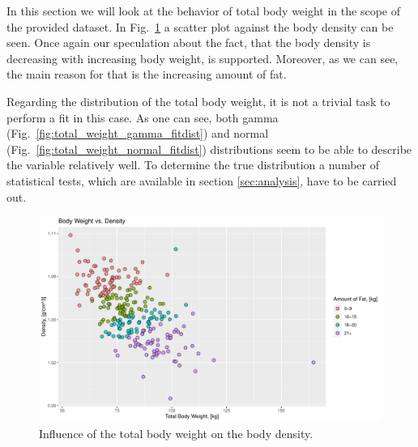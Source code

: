 \documentclass[11pt,american,american]{article}
\begin{document}
In this section we will look at the behavior of total body weight in the scope of the provided dataset. In Fig.~\ref{fig:total_weight_vs_density} a scatter plot against the body density can be seen. Once again our speculation about the fact, that the body density is decreasing with increasing body weight, is supported. Moreover, as we can see, the main reason for that is the increasing amount of fat. 

\medskip

Regarding the distribution of the total body weight, it is not a trivial task to perform a fit in this case. As one can see, both gamma (Fig.~\ref{fig:total_weight_gamma_fitdist}) and normal (Fig.~\ref{fig:total_weight_normal_fitdist}) distributions seem to be able to describe the variable relatively well. To determine the true distribution a number of statistical tests, which are available in section \ref{sec:analysis}, have to be carried out.

\bigskip


\begin{figure}[H]
	\centering
	\includegraphics[width=1.0\linewidth]{Images/FIGURES/total_weight_vs_density}
	\caption{Influence of the total body weight on the body density.}
	\label{fig:total_weight_vs_density}
\end{figure}
\vspace*{\fill}

\newpage
\end{document}
